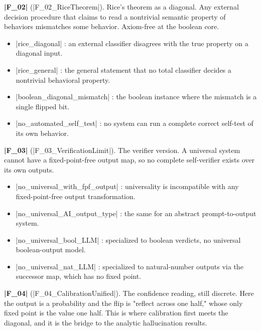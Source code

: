 \documentclass{memoir}
\begin{document}
\textbf{\LeanVerb|F_02|} (\LeanVerb|F_02_RiceTheorem|). Rice's theorem as a diagonal. Any external decision
procedure that claims to read a nontrivial semantic property of behaviors mismatches
some behavior. Axiom-free at the boolean core.

\begin{itemize}
\item \LeanVerb|rice_diagonal| : an external classifier disagrees with the true property on a
   diagonal input.
\item \LeanVerb|rice_general| : the general statement that no total classifier decides a
   nontrivial behavioral property.
\item \LeanVerb|boolean_diagonal_mismatch| : the boolean instance where the mismatch is a single
   flipped bit.
\item \LeanVerb|no_automated_self_test| : no system can run a complete correct self-test of its
   own behavior.

\end{itemize}


\textbf{\LeanVerb|F_03|} (\LeanVerb|F_03_VerificationLimit|). The verifier version. A universal system cannot
have a fixed-point-free output map, so no complete self-verifier exists over its own
outputs.

\begin{itemize}
\item \LeanVerb|no_universal_with_fpf_output| : universality is incompatible with any
   fixed-point-free output transformation.
\item \LeanVerb|no_universal_AI_output_type| : the same for an abstract prompt-to-output system.
\item \LeanVerb|no_universal_bool_LLM| : specialized to boolean verdicts, no universal
   boolean-output model.
\item \LeanVerb|no_universal_nat_LLM| : specialized to natural-number outputs via the successor
   map, which has no fixed point.

\end{itemize}


\textbf{\LeanVerb|F_04|} (\LeanVerb|F_04_CalibrationUnified|). The confidence reading, still discrete. Here
the output is a probability and the flip is "reflect across one half," whose only
fixed point is the value one half. This is where calibration first meets the
diagonal, and it is the bridge to the analytic hallucination results.
\end{document}
